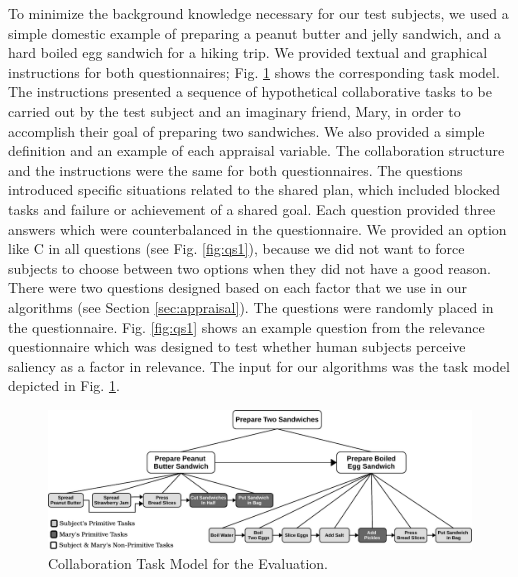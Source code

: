 \documentclass[12pt]{report}
\begin{document}
To minimize the background knowledge necessary for our test subjects, we used a
simple domestic example of preparing a peanut butter and jelly sandwich, and a
hard boiled egg sandwich for a hiking trip. We provided textual and graphical
instructions for both questionnaires; Fig. \ref{fig:taskModel} shows the
corresponding task model. The instructions presented a sequence of hypothetical
collaborative tasks to be carried out by the test subject and an imaginary
friend, Mary, in order to accomplish their goal of preparing two sandwiches. We
also provided a simple definition and an example of each appraisal variable. The
collaboration structure and the instructions were the same for both
questionnaires. The questions introduced specific situations related to the
shared plan, which included blocked tasks and failure or achievement of a shared
goal. Each question provided three answers which were counterbalanced in the
questionnaire. We provided an option like C in all questions (see Fig.
\ref{fig:qs1}), because we did not want to force subjects to choose between two
options when they did not have a good reason. There were two questions designed
based on each factor that we use in our algorithms (see Section
\ref{sec:appraisal}). The questions were randomly placed in the questionnaire.
Fig. \ref{fig:qs1} shows an example question from the relevance questionnaire
which was designed to test whether human subjects perceive saliency as a factor
in relevance. The input for our algorithms was the task model depicted in Fig.
\ref{fig:taskModel}.

\begin{figure}[tbh]
  \centering
  \includegraphics[width=1\textwidth]{figure/taskModel-croped.pdf}
  \caption{Collaboration Task Model for the Evaluation.}
  \label{fig:taskModel}
  \vspace*{-5mm}
\end{figure}
\end{document}
